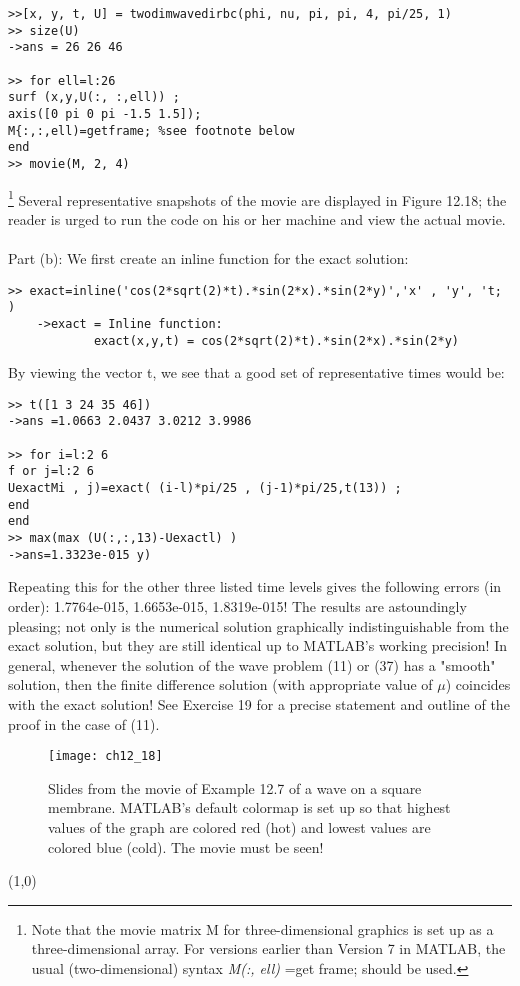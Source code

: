 \documentclass[../main.tex]{subfiles}
\begin{document}
\begin{lstlisting}[numbers=none,frame=none] 
 >>[x, y, t, U] = twodimwavedirbc(phi, nu, pi, pi, 4, pi/25, 1) 
>> size(U) 
->ans = 26 26 46
 
>> for ell=l:26 
surf (x,y,U(:, :,ell)) ; 
axis([0 pi 0 pi -1.5 1.5]); 
M{:,:,ell)=getframe; %see footnote below 
end 
>> movie(M, 2, 4)
\end{lstlisting}\footnote{Note that the movie matrix M for three-dimensional graphics is set up as a three-dimensional array. For versions earlier than Version 7 in MATLAB, the usual (two-dimensional) syntax \textit{M(:, ell)} =get frame; should be used.}
Several representative snapshots of the movie are displayed in Figure 12.18; the reader is urged to run the code on his or her machine and view the actual movie. 
\\
\\
Part (b): We first create an inline function for the exact solution:
\begin{lstlisting}[numbers=none,frame=none] 
>> exact=inline('cos(2*sqrt(2)*t).*sin(2*x).*sin(2*y)','x' , 'y', 't; ) 
	->exact = Inline function: 
			exact(x,y,t) = cos(2*sqrt(2)*t).*sin(2*x).*sin(2*y)
\end{lstlisting}
By viewing the vector t, we see that a good set of representative times would be: 
\begin{lstlisting}[numbers=none,frame=none] 
>> t([1 3 24 35 46]) 
->ans =1.0663 2.0437 3.0212 3.9986 

>> for i=l:2 6 
f or j=l:2 6 
UexactMi , j)=exact( (i-l)*pi/25 , (j-1)*pi/25,t(13)) ; 
end 
end 
>> max(max (U(:,:,13)-Uexactl) ) 
->ans=1.3323e-015 y)
\end{lstlisting}
Repeating this for the other three listed time levels gives the following errors (in order): 1.7764e-015, 1.6653e-015, 1.8319e-015! The results are astoundingly pleasing; not only is the numerical solution graphically indistinguishable from the exact solution, but they are still identical up to MATLAB's working precision! In general, whenever the solution of the wave problem (11) or (37) has a "smooth"  solution, then the finite difference solution (with appropriate value of $\mu$) coincides with the exact solution! See Exercise 19 for a precise statement and outline of the proof in the case of (11). 
\begin{figure}[H]
	\centering
	\texttt{[image: ch12\_18]}
	\caption{\textsf{Slides from the movie of Example 12.7 of a wave on a square membrane. 
MATLAB's default colormap is set up so that highest values of the graph are colored red 
(hot) and lowest values are colored blue (cold). The movie must be seen!}}
	\label{pfig:ch12_18}
\end{figure}
\line(1,0){\textwidth}
\end{document}

